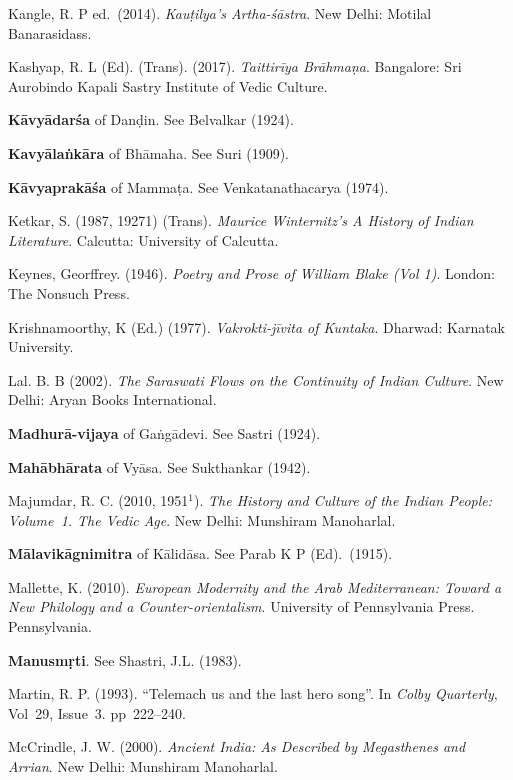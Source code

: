 \begin{thebibliography}{99}
Kangle, R. P ed.\ (2014). {\sl Kauṭilya’s Artha-śāstra}. New Delhi: Motilal Banarasidass. 

Kashyap, R. L (Ed). (Trans). (2017). {\sl Taittirīya Brāhmaṇa}. Bangalore: Sri Aurobindo Kapali Sastry Institute of Vedic Culture. 

{\bf Kāvyādarśa} of Danḍin. See Belvalkar (1924).  

{\bf Kavyālaṅkāra} of Bhāmaha. See Suri (1909).

{\bf Kāvyaprakāśa} of Mammaṭa. See Venkatanathacarya (1974).

Ketkar, S. (1987, 19271) (Trans). {\sl Maurice Winternitz’s A History of Indian Literature}. Calcutta: University of Calcutta. 

Keynes, Georffrey. (1946). {\sl Poetry and Prose of William Blake (Vol 1)}. London: The Nonsuch Press. 

Krishnamoorthy, K (Ed.) (1977). {\sl Vakrokti-jīvita of Kuntaka}. Dharwad: Karnatak University. 

Lal. B. B (2002). {\sl The Saraswati Flows on the Continuity of Indian Culture}. New Delhi: Aryan Books International. 

{\bf Madhurā-vijaya} of Gaṅgādevi. See Sastri (1924).

{\bf Mahābhārata} of Vyāsa. See Sukthankar (1942).

Majumdar, R. C. (2010, 1951$^{1}$). {\sl The History and Culture of the Indian People: Volume~1. The Vedic Age}. New Delhi: Munshiram Manoharlal. 

{\bf Mālavikāgnimitra} of Kālidāsa. See Parab K P (Ed).\ (1915).

Mallette, K. (2010). {\sl European Modernity and the Arab Mediterranean: Toward a New Philology and a Counter-orientalism}. University of Pennsylvania Press. Pennsylvania.

{\bf Manusmṛti}. See Shastri, J.L. (1983).

Martin, R. P. (1993). “Telemach us and the last hero song”. In {\sl Colby Quarterly}, Vol~29, Issue~3. pp~222--240.

McCrindle, J. W. (2000). {\sl Ancient India: As Described by Megasthenes and Arrian}. New Delhi: Munshiram Manoharlal. 


\end{thebibliography}
